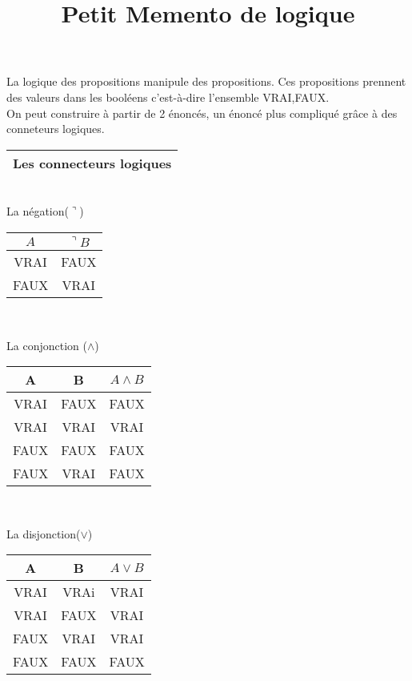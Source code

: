 \documentclass[a4]{article}
\title{Petit Memento de logique}
\begin{document}
\maketitle
La logique des propositions manipule des propositions. Ces propositions prennent des valeurs dans les 
booléens c'est-à-dire l'ensemble {VRAI,FAUX}.\\
On peut construire à partir de 2 énoncés, un énoncé plus compliqué grâce à des conneteurs logiques.\\

\begin{tabular}[h]{|c|}
\hline
Les connecteurs logiques \\
\hline
\end{tabular}\\


La négation($\urcorner$)

\vspace{0.1cm}
\begin{tabular}[h]{|c|c|}
\hline
$A$ & $\urcorner B$\\
\hline
VRAI & FAUX\\
\hline
FAUX & VRAI\\
\hline
\end{tabular}\\
\vspace {1cm}

La conjonction ($\wedge$)

\vspace{0.1cm}
\begin{tabular}[h]{|c|c|c|}
\hline
A & B & $A\wedge B$\\
\hline
VRAI & FAUX & FAUX\\
\hline
VRAI & VRAI & VRAI\\
\hline
FAUX & FAUX & FAUX\\
\hline
FAUX & VRAI & FAUX\\
\hline 
\end{tabular}\\
\vspace {1cm}

La disjonction($\vee$)

\vspace{0.1cm}
\begin{tabular}[h]{|c|c|c|}
\hline
A & B & $A\vee B$\\
\hline
VRAI & VRAi & VRAI\\
\hline
VRAI & FAUX & VRAI\\
\hline
FAUX & VRAI & VRAI\\
\hline
FAUX & FAUX & FAUX\\
\hline
\end{tabular}\\
\vspace{2cm}
\end{document}
